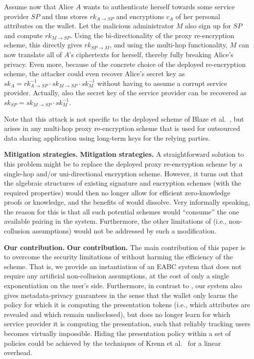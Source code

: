 \documentclass[runningheads]{llncs}
\begin{document}
Assume now that Alice $A$ wants to authenticate herself towards some service provider $SP$ and thus stores $rk_{A\to SP}$ and encryptions $c_A$ of her personal attributes on the wallet.
Let the malicious administrator $M$ also sign up for $SP$ and compute $rk_{M\to SP}$.
Using the bi-directionality of the proxy re-encryption scheme, this directly gives $rk_{SP\to M}$, and using the multi-hop functionality, $M$ can now translate all of $A$'s ciphertexts for herself, thereby fully breaking Alice's privacy.
Even more, because of the concrete choice of the deployed re-encryption scheme, the attacker could even recover Alice's secret key as $sk_A=rk_{A\to SP}^{-1}\cdot sk_{M\to SP}\cdot sk_{M}^{-1}$ without having to assume a corrupt service provider.
Actually, also the secret key of the service provider can be recovered as $sk_{SP}=sk_{M\to SP}\cdot sk_{M}^{-1}$.

Note that this attack is not specific to the deployed scheme of Blaze et al.~\cite{BBS}, but arises in any multi-hop proxy re-encryption scheme that is used for outsourced data sharing application using long-term keys for the relying parties.

\ifCANS
\textbf{Mitigation strategies.}
\else
\medskip\textbf{Mitigation strategies.}
\fi
A straightforward solution to this problem might be to replace the deployed proxy re-encryption scheme by a single-hop and/or uni-directional encryption scheme.
However, it turns out that the algebraic structures of existing signature and encryption schemes (with the required properties)
 would then no longer allow for efficient zero-knowledge proofs or knowledge, and the benefits of \cite{towardsEABC} would dissolve.
Very informally speaking, the reason for this is that all such potential schemes would ``consume'' the one available pairing in the system.
Furthermore, the other limitations of \cite{towardsEABC} (i.e., non-collusion assumptions) would not be addressed by such a modification.

\ifCANS
\textbf{Our contribution.}
\else
\medskip\textbf{Our contribution.}
\fi
The main contribution of this paper is to overcome the security limitations of \cite{towardsEABC} without harming the efficiency of the scheme.
That is, we provide an instantiation of an EABC system that does not require any artificial non-collusion assumptions, at the cost of only a single exponentiation on the user's side.
Furthermore, in contrast to \cite{towardsEABC}, our system also gives metadata-privacy guarantees in the sense that the wallet only learns the policy for which it is computing the presentation tokens (i.e., which attributes are revealed and which remain undisclosed), but does no longer learn for which service provider it is computing the presentation, such that reliably tracking users becomes virtually impossible.
Hiding the presentation policy within a set of policies could be achieved by the techniques of Krenn et al.~\cite[\S\,6.1]{towardsEABC} for a linear overhead.
\end{document}
